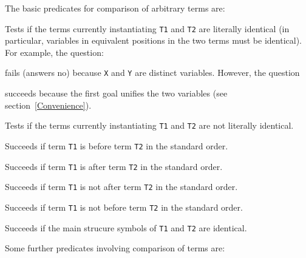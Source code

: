 The basic predicates for comparison of arbitrary terms are:
\begin{description}
    Tests if the terms currently instantiating {\tt T1} and {\tt T2}
    are literally identical (in particular, variables in equivalent positions
    in the two terms must be identical).
    For example, the question:


    \noindent
    fails (answers no) because {\tt X} and {\tt Y} are distinct variables.
    However, the question


    \noindent
    succeeds because the first goal unifies the two variables 
    (see section~\ref{Convenience}).

    Tests if the terms currently instantiating {\tt T1} and {\tt T2}
    are not literally identical.

    Succeeds if term {\tt T1} is before term {\tt T2} in the standard order.

    Succeeds if term {\tt T1} is after term {\tt T2} in the standard order.

    Succeeds if term {\tt T1} is not after term {\tt T2} in the standard order.

    Succeeds if term {\tt T1} is not before term {\tt T2} in the standard order.

    Succeeds if the main strucure symbols of {\tt T1} and {\tt T2} are identical.

\end{description}

Some further predicates involving comparison of terms are:

